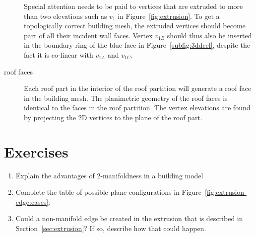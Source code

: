 \begin{description}
Special attention needs to be paid to vertices that are extruded to more than two elevations such as $v_1$ in Figure~\ref{fig:extrusion}.
To get a topologically correct building mesh, the extruded vertices should become part of all their incident wall faces.
Vertex $v_{1B}$ should thus also be inserted in the boundary ring of the blue face in Figure~\ref{subfig:3ddcel}, despite the fact it is co-linear with $v_{1A}$ and $v_{1C}$.

\item[roof faces]  Each roof part in the interior of the roof partition will generate a roof face in the building mesh. The planimetric geometry of the roof faces is identical to the faces in the roof partition. The vertex elevations are found by projecting the 2D vertices to the plane of the roof part.
\end{description}

%



%
\section{Exercises}

\begin{enumerate}
  \item Explain the advantages of 2-manifoldness in a building model
  \item Complete the table of possible plane configurations in Figure~\ref{fig:extrusion-edge:cases}.
  \item Could a non-manifold edge be created in the extrusion that is described in Section~\ref{sec:extrusion}? If so, describe how that could happen.
\end{enumerate}
